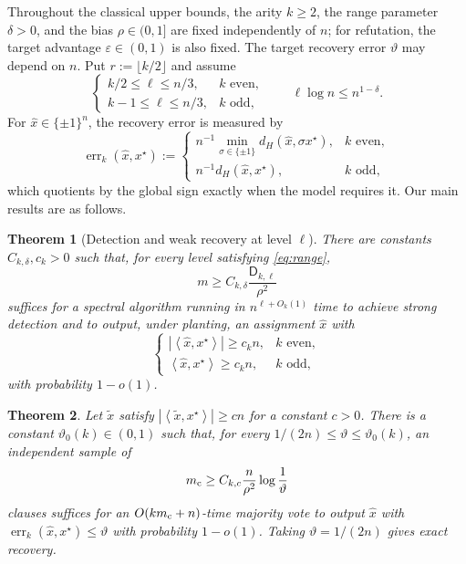 \documentclass[11pt]{article}
\newtheorem{theorem}{Theorem}[section]
\theoremstyle{definition}
\theoremstyle{remark}
\newcommand{\1}{\mathbf 1}
\newcommand{\eps}{\varepsilon}
\newcommand{\Dkl}{\mathsf D_{k,\ell}}
\newcommand{\xstar}{{x^\star}}
\newcommand{\ip}[2]{\left\langle #1,#2\right\rangle}
\DeclareMathOperator{\err}{err}
\numberwithin{equation}{section}
\begin{document}
Throughout the classical upper bounds, the arity $k\ge2$, the range
parameter $\delta>0$, and the bias $\rho\in(0,1]$ are fixed
independently of $n$; for refutation, the target advantage
$\eps\in(0,1)$ is also fixed.  The target recovery error $\vartheta$ may
depend on $n$.  Put $r:=\lfloor k/2\rfloor$ and assume
\begin{equation}\label{eq:range}
\begin{cases}
 k/2\le\ell\le n/3,&k\text{ even},\\
 k-1\le\ell\le n/3,&k\text{ odd},
\end{cases}
\qquad
 \ell\log n\le n^{1-\delta}.
\end{equation}
For $\widehat x\in\{\pm1\}^n$, the recovery error is measured by
\begin{equation}\label{eq:recovery-error}
 \err_k(\widehat x,\xstar):=
 \begin{cases}
 n^{-1}\min_{\sigma\in\{\pm1\}}d_H(\widehat x,\sigma\xstar),
   &k\text{ even},\\[1mm]
 n^{-1}d_H(\widehat x,\xstar),&k\text{ odd},
 \end{cases}
\end{equation}
which quotients by the global sign exactly when the model requires it.
Our main results are as follows.

\begin{theorem}[Detection and weak recovery at level $\ell$]
\label{thm:main-inference}
There are constants $C_{k,\delta},c_k>0$ such that, for every level satisfying
\cref{eq:range},
\begin{equation}\label{eq:inference-threshold}
 m\ge C_{k,\delta}\frac{\Dkl}{\rho^2}
\end{equation}
suffices for a spectral algorithm running in $n^{\ell+O_k(1)}$ time to
achieve strong detection and to output, under planting, an assignment
$\widehat x$ with
\[
 \begin{cases}
 |\ip{\widehat x}{\xstar}|\ge c_kn,&k\text{ even},\\[1mm]
 \ip{\widehat x}{\xstar}\ge c_kn,&k\text{ odd},
 \end{cases}
\]
with probability $1-o(1)$.
\end{theorem}

\begin{theorem}
\label{thm:main-boost}
Let $\widetilde x$ satisfy $|\ip{\widetilde x}{\xstar}|\ge cn$ for a
constant $c>0$.  There is a constant $\vartheta_0(k)\in(0,1)$ such
that, for every $1/(2n)\le\vartheta\le\vartheta_0(k)$, an
independent sample of
\begin{equation}\label{eq:cleanup-curve}
 m_{\rm c}\ge C_{k,c}\frac n{\rho^2}\log\frac1\vartheta
\end{equation}
clauses suffices for an $O(km_{\rm c}+n)$-time majority vote to output
$\widehat x$ with $\err_k(\widehat x,\xstar)\le\vartheta$ with
probability $1-o(1)$.  Taking $\vartheta=1/(2n)$ gives exact recovery.
\end{theorem}
\end{document}
